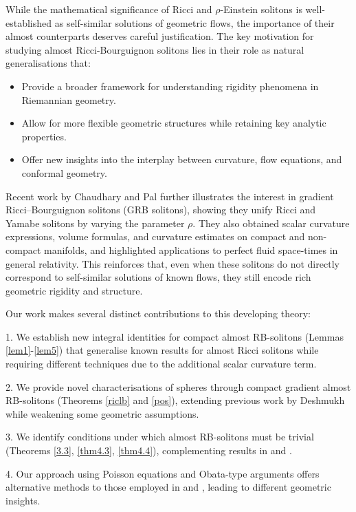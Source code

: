 \documentclass[a4paper, twoside, 10pt]{article}
\numberwithin{equation}{section}
\theoremstyle{definition}
\begin{document}
While the mathematical significance of Ricci and $\rho$-Einstein solitons is well-established as self-similar solutions of geometric flows, the importance of their almost counterparts deserves careful justification. The key motivation for studying almost Ricci-Bourguignon solitons lies in their role as natural generalisations that:
\begin{itemize}
    \item Provide a broader framework for understanding rigidity phenomena in Riemannian geometry.
    \item Allow for more flexible geometric structures while retaining key analytic properties.
    \item Offer new insights into the interplay between curvature, flow equations, and conformal geometry.
\end{itemize}

Recent work by Chaudhary and Pal \cite{chaudhary2025gradient} further illustrates the interest in gradient Ricci--Bourguignon solitons (GRB solitons), showing they unify Ricci and Yamabe solitons by varying the parameter $\rho$. 
They also obtained scalar curvature expressions, volume formulas, and curvature estimates on compact and non-compact manifolds, and highlighted applications to perfect fluid space-times in general relativity.
This reinforces that, even when these solitons do not directly correspond to self-similar solutions of known flows, they still encode rich geometric rigidity and structure.

Our work makes several distinct contributions to this developing theory:

1. We establish new integral identities for compact almost RB-solitons (Lemmas \ref{lem1}-\ref{lem5}) that generalise known results for almost Ricci solitons \cite{BBR} while requiring different techniques due to the additional scalar curvature term.

2. We provide novel characterisations of spheres through compact gradient almost RB-solitons (Theorems \ref{riclb} and \ref{pos}), extending previous work by Deshmukh \cite{SDARSIS} 
while weakening some geometric assumptions.

3. We identify conditions under which almost RB-solitons must be trivial (Theorems \ref{3.3}, \ref{thm4.3}, \ref{thm4.4}), complementing results in \cite{SDANARS} and \cite{ghosh2022certain}.

4. Our approach using Poisson equations and Obata-type arguments offers alternative methods to those employed in \cite{SDRBS} and \cite{BBR}, leading to different geometric insights.
\end{document}
